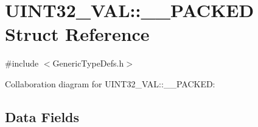 \hypertarget{struct_u_i_n_t32___v_a_l_1_1_____p_a_c_k_e_d}{}\section{U\+I\+N\+T32\+\_\+\+V\+A\+L\+:\+:\+\_\+\+\_\+\+P\+A\+C\+K\+E\+D Struct Reference}
\label{struct_u_i_n_t32___v_a_l_1_1_____p_a_c_k_e_d}


{\ttfamily \#include $<$Generic\+Type\+Defs.\+h$>$}



Collaboration diagram for U\+I\+N\+T32\+\_\+\+V\+A\+L\+:\+:\+\_\+\+\_\+\+P\+A\+C\+K\+E\+D\+:
\subsection*{Data Fields}
